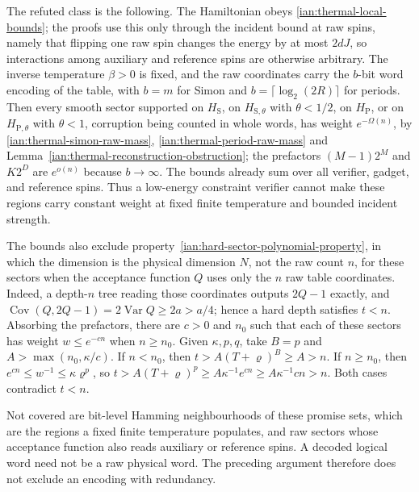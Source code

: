 \begin{remark}
\label{ian:thermal-raw-scope}
The refuted class is the following. The Hamiltonian obeys
\eqref{ian:thermal-local-bounds}; the proofs use this only through the
incident bound at raw spins, namely that flipping one raw spin changes
the energy by at most \(2dJ\), so interactions among auxiliary and
reference spins are otherwise arbitrary. The inverse temperature
\(\beta>0\) is fixed, and the raw coordinates carry the \(b\)-bit word
encoding of the table, with \(b=m\) for Simon and
\(b=\lceil\log_2(2R)\rceil\) for periods. Then every smooth sector
supported on \(H_{\mathrm S}\), on \(H_{\mathrm S,\theta}\) with
\(\theta<1/2\), on \(H_{\mathrm P}\), or on \(H_{\mathrm P,\theta}\) with
\(\theta<1\), corruption being counted in whole words, has weight
\(e^{-\Omega(n)}\), by \eqref{ian:thermal-simon-raw-mass},
\eqref{ian:thermal-period-raw-mass} and
Lemma~\ref{ian:thermal-reconstruction-obstruction}; the prefactors
\((M-1)2^M\) and \(K2^D\) are \(e^{o(n)}\) because \(b\to\infty\).
The bounds already sum over all verifier, gadget, and reference spins.
Thus a low-energy constraint verifier cannot make these regions carry
constant weight at fixed finite temperature and bounded incident
strength.

The bounds also exclude property~\eqref{ian:hard-sector-polynomial-property},
in which the dimension is the physical dimension \(N\), not the raw
count \(n\), for these sectors when the acceptance function \(Q\) uses only the \(n\)
raw table coordinates. Indeed, a depth-\(n\) tree reading those
coordinates outputs \(2Q-1\) exactly, and
\(\operatorname{Cov}(Q,2Q-1)=2\operatorname{Var}Q\ge2a>a/4\); hence a hard
depth satisfies \(t<n\). Absorbing the prefactors, there are \(c>0\) and
\(n_0\) such that each of these sectors has weight \(w\le e^{-cn}\) when
\(n\ge n_0\). Given \(\kappa,p,q\), take \(B=p\) and
\(A>\max(n_0,\kappa/c)\). If \(n<n_0\), then
\(t>A(T+\varrho)^B\ge A>n\). If \(n\ge n_0\), then
\(e^{cn}\le w^{-1}\le\kappa\varrho^p\), so
\(t>A(T+\varrho)^p\ge A\kappa^{-1}e^{cn}\ge A\kappa^{-1}cn>n\). Both
cases contradict \(t<n\).

Not covered are bit-level Hamming neighbourhoods of these promise
sets, which are the regions a fixed finite temperature populates, and
raw sectors whose acceptance function also reads auxiliary or
reference spins. A decoded logical word need not be a raw physical
word. The preceding argument therefore does not exclude an encoding
with redundancy.
\end{remark}

